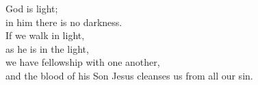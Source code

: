 
\lettrine{G}{}od is light;\\
in him there is no darkness.\\
If we walk in light,\\
as he is in the light,\\
we have fellowship with one another,\\
and the blood of his Son Jesus cleanses us from all our sin.